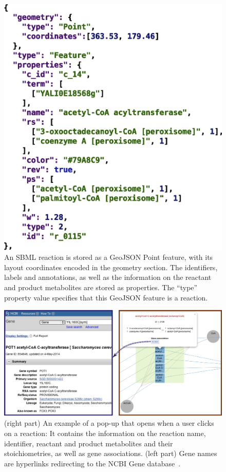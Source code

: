 \documentclass{bmcart}
\begin{document}
\begin{backmatter}
\begin{figure}[h!]
\includegraphics[scale=1]{figure4.eps}
  \caption{
  \label{fig:geojson}
      An SBML reaction is stored as a GeoJSON Point feature, with its layout coordinates encoded in the geometry section. The identifiers, labels and annotations, as well as the information on the reactant and product metabolites are stored as properties. The ``type'' property value specifies that this GeoJSON feature is a reaction.}
      \end{figure}
      
\begin{figure}[h!]
\includegraphics[scale=1]{figure5.eps}
  \caption{
  \label{fig:pop_up}
      (right part) An example of a pop-up that opens when a user clicks on a reaction: It contains the information on the reaction name, identifier, reactant and product metabolites and their stoichiometries, as well as gene associations. (left part) Gene names are hyperlinks redirecting to the NCBI Gene database~\cite{NCBI}.}
      \end{figure}


\end{backmatter}
\end{document}
